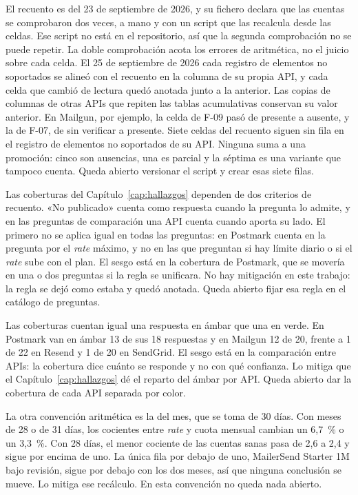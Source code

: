 El recuento es del 23 de septiembre de 2026, y su fichero declara que las cuentas se comprobaron dos veces, a mano y con un script que las recalcula desde las celdas.
Ese script no está en el repositorio, así que la segunda comprobación no se puede repetir.
La doble comprobación acota los errores de aritmética, no el juicio sobre cada celda.
El 25 de septiembre de 2026 cada registro de elementos no soportados se alineó con el recuento en la columna de su propia API, y cada celda que cambió de lectura quedó anotada junto a la anterior.
Las copias de columnas de otras APIs que repiten las tablas acumulativas conservan su valor anterior.
En Mailgun, por ejemplo, la celda de F-09 pasó de presente a ausente, y la de F-07, de sin verificar a presente.
Siete celdas del recuento siguen sin fila en el registro de elementos no soportados de su API.
Ninguna suma a una promoción: cinco son ausencias, una es parcial y la séptima es una variante que tampoco cuenta.
Queda abierto versionar el script y crear esas siete filas.

Las coberturas del Capítulo~\ref{cap:hallazgos} dependen de dos criterios de recuento.
«No publicado» cuenta como respuesta cuando la pregunta lo admite, y en las preguntas de comparación una API cuenta cuando aporta su lado.
El primero no se aplica igual en todas las preguntas: en Postmark cuenta en la pregunta por el \textit{rate} máximo, y no en las que preguntan si hay límite diario o si el \textit{rate} sube con el plan.
El sesgo está en la cobertura de Postmark, que se movería en una o dos preguntas si la regla se unificara.
No hay mitigación en este trabajo: la regla se dejó como estaba y quedó anotada.
Queda abierto fijar esa regla en el catálogo de preguntas.

Las coberturas cuentan igual una respuesta en ámbar que una en verde.
En Postmark van en ámbar 13 de sus 18 respuestas y en Mailgun 12 de 20, frente a 1 de 22 en Resend y 1 de 20 en SendGrid.
El sesgo está en la comparación entre APIs: la cobertura dice cuánto se responde y no con qué confianza.
Lo mitiga que el Capítulo~\ref{cap:hallazgos} dé el reparto del ámbar por API.
Queda abierto dar la cobertura de cada API separada por color.

La otra convención aritmética es la del mes, que se toma de 30 días.
Con meses de 28 o de 31 días, los cocientes entre \textit{rate} y cuota mensual cambian un 6,7~\% o un 3,3~\%.
Con 28 días, el menor cociente de las cuentas sanas pasa de 2,6 a 2,4 y sigue por encima de uno.
La única fila por debajo de uno, MailerSend Starter 1M bajo revisión, sigue por debajo con los dos meses, así que ninguna conclusión se mueve.
Lo mitiga ese recálculo.
En esta convención no queda nada abierto.

